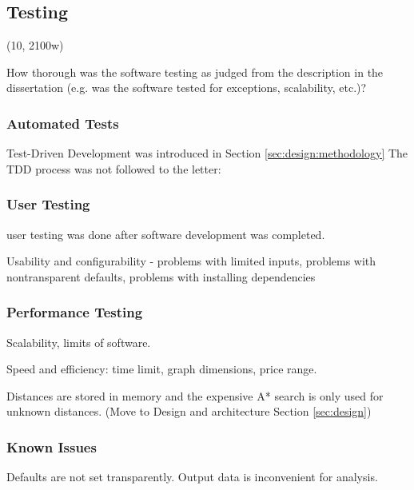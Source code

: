 \subsection{Testing}

(10, 2100w)

How thorough was the software testing as judged from the description in the
dissertation (e.g. was the software tested for exceptions, scalability, etc.)?


\subsubsection{Automated Tests}

Test-Driven Development was introduced in Section \ref{sec:design:methodology}
The TDD process was not followed to the letter: 

\subsubsection{User Testing}

user testing was done after software development
was completed. 

Usability and configurability - problems with limited inputs, problems with
nontransparent defaults, problems with installing dependencies


\subsubsection{Performance Testing}

Scalability, limits of software. 

Speed and efficiency: time limit, graph dimensions, price range. 

Distances are stored in memory and the expensive A* search is only used for
unknown distances. (Move to Design and architecture Section \ref{sec:design})

\subsubsection{Known Issues}

Defaults are not set transparently. Output data is inconvenient for analysis. 
